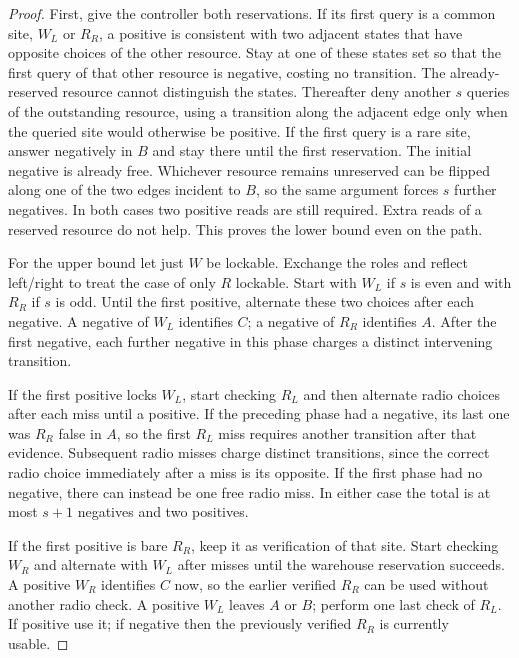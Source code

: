 \documentclass[11pt]{article}
\begin{document}
\begin{proof}
First, give the controller both reservations. If its first query is a common site, $W_L$ or $R_R$, a positive is consistent with two adjacent states that have opposite choices of the other resource. Stay at one of these states set so that the first query of that other resource is negative, costing no transition. The already-reserved resource cannot distinguish the states. Thereafter deny another $s$ queries of the outstanding resource, using a transition along the adjacent edge only when the queried site would otherwise be positive. If the first query is a rare site, answer negatively in $B$ and stay there until the first reservation. The initial negative is already free. Whichever resource remains unreserved can be flipped along one of the two edges incident to $B$, so the same argument forces $s$ further negatives. In both cases two positive reads are still required. Extra reads of a reserved resource do not help. This proves the lower bound even on the path.

For the upper bound let just $W$ be lockable. Exchange the roles and reflect left/right to treat the case of only $R$ lockable. Start with $W_L$ if $s$ is even and with $R_R$ if $s$ is odd. Until the first positive, alternate these two choices after each negative. A negative of $W_L$ identifies $C$; a negative of $R_R$ identifies $A$. After the first negative, each further negative in this phase charges a distinct intervening transition.

If the first positive locks $W_L$, start checking $R_L$ and then alternate radio choices after each miss until a positive. If the preceding phase had a negative, its last one was $R_R$ false in $A$, so the first $R_L$ miss requires another transition after that evidence. Subsequent radio misses charge distinct transitions, since the correct radio choice immediately after a miss is its opposite. If the first phase had no negative, there can instead be one free radio miss. In either case the total is at most $s+1$ negatives and two positives.

If the first positive is bare $R_R$, keep it as verification of that site. Start checking $W_R$ and alternate with $W_L$ after misses until the warehouse reservation succeeds. A positive $W_R$ identifies $C$ now, so the earlier verified $R_R$ can be used without another radio check. A positive $W_L$ leaves $A$ or $B$; perform one last check of $R_L$. If positive use it; if negative then the previously verified $R_R$ is currently usable.


\end{proof}
\end{document}
